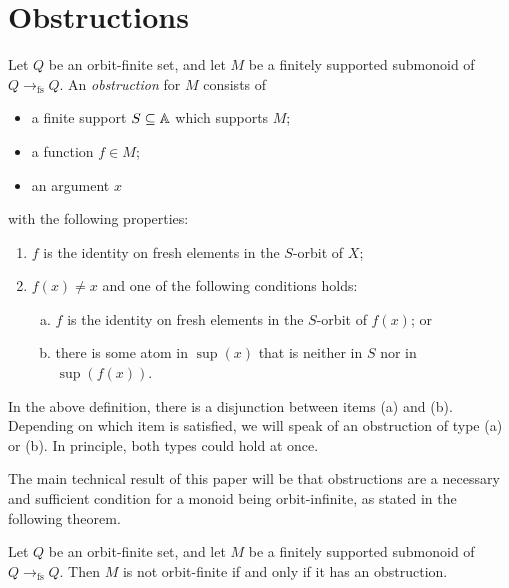 \section{Obstructions}
\label{sec:obstructions}

\newcommand{\fsfun}{\underset {\text{fs}} \longrightarrow}
\newcommand{\smallfsfun}{\to_{\text{fs}}}
\begin{definition}[Obstruction]
    Let $Q$ be an orbit-finite set, and let $M$ be a finitely supported  submonoid of $Q \smallfsfun Q$.
    An \emph{obstruction} for $M$ consists of 
    \begin{itemize}
        \item a finite support $S \subseteq \mathbb A$ which supports $M$;
        \item a function $f \in M$;
        \item an argument $x$
    \end{itemize}
    with the following properties:
    \begin{enumerate}
        \item $f$ is the identity on fresh elements in the  $S$-orbit of  $X$;
        \item $f(x) \neq x$ and one of the following conditions holds: 
        \begin{enumerate}[(a)]
            \item $f$ is  the identity on fresh elements in the $S$-orbit of $f(x)$; or 
            \item there is some atom in $\sup(x)$ that is neither in $S$ nor in $\sup(f(x))$. 
        \end{enumerate}
    \end{enumerate}
\end{definition}

In the above definition, there is a disjunction between items (a) and (b). Depending on which item is satisfied, we will speak of an obstruction of type (a) or (b). In principle, both types could hold at once.

The main technical result of this paper will be that obstructions are a necessary and sufficient condition for a monoid being orbit-infinite, as stated in the following theorem. 


\begin{theorem}\label{thm:obstructions-sound-and-complete}
    Let $Q$ be an orbit-finite set, and let $M$ be a finitely supported submonoid of $Q \smallfsfun Q$.
    Then $M$ is not orbit-finite if and only if it has an obstruction.
\end{theorem}

